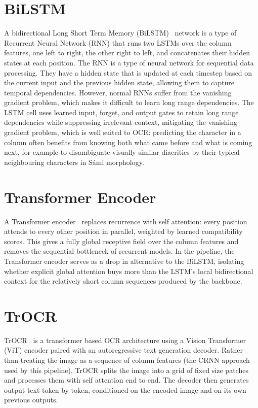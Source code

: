 \section{BiLSTM}
\label{sec:appendix-bilstm}

A bidirectional Long Short Term Memory (BiLSTM)~\cite{hochreiter1997lstm} network is a type of Recurrent Neural Network (RNN) that runs two LSTMs over the column features, one left to right, the other right to left, and concatenates their hidden states at each position.
The RNN is a type of neural network for sequential data processing. They have a hidden state that is updated at each timestep based on the current input and the previous hidden state, allowing them to capture temporal dependencies. However, normal RNNs suffer from the vanishing gradient problem, which makes it difficult to learn long range dependencies.
The LSTM cell uses learned input, forget, and output gates to retain long range dependencies while suppressing irrelevant context, mitigating the vanishing gradient problem, which is well suited to OCR: predicting the character in a column often benefits from knowing both what came before and what is coming next, for example to disambiguate visually similar diacritics by their typical neighbouring characters in S\'{a}mi morphology.

\section{Transformer Encoder}
\label{sec:appendix-transformer}

A Transformer encoder~\cite{vaswani2017attention} replaces recurrence with self attention: every position attends to every other position in parallel, weighted by learned compatibility scores. This gives a fully global receptive field over the column features and removes the sequential bottleneck of recurrent models.
In the pipeline, the Transformer encoder serves as a drop in alternative to the BiLSTM, isolating whether explicit global attention buys more than the LSTM's local bidirectional context for the relatively short column sequences produced by the backbone.

\section{TrOCR}
\label{sec:appendix-trocr}

TrOCR~\cite{li2023trocr} is a transformer based OCR architecture using a Vision Transformer (ViT) encoder paired with an autoregressive text generation decoder. Rather than treating the image as a sequence of column features (the CRNN approach used by this pipeline), TrOCR splits the image into a grid of fixed size patches and processes them with self attention end to end. The decoder then generates output text token by token, conditioned on the encoded image and on its own previous outputs.

